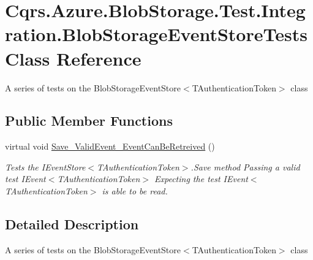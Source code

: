 \hypertarget{classCqrs_1_1Azure_1_1BlobStorage_1_1Test_1_1Integration_1_1BlobStorageEventStoreTests}{}\section{Cqrs.\+Azure.\+Blob\+Storage.\+Test.\+Integration.\+Blob\+Storage\+Event\+Store\+Tests Class Reference}
\label{classCqrs_1_1Azure_1_1BlobStorage_1_1Test_1_1Integration_1_1BlobStorageEventStoreTests}


A series of tests on the Blob\+Storage\+Event\+Store$<$\+T\+Authentication\+Token$>$ class  


\subsection*{Public Member Functions}
\begin{DoxyCompactItemize}
\item 
virtual void \hyperlink{classCqrs_1_1Azure_1_1BlobStorage_1_1Test_1_1Integration_1_1BlobStorageEventStoreTests_ac74c18e7aeeaedb7e0328b1ab8b2a8e8_ac74c18e7aeeaedb7e0328b1ab8b2a8e8}{Save\+\_\+\+Valid\+Event\+\_\+\+Event\+Can\+Be\+Retreived} ()
\begin{DoxyCompactList}\small\item\em Tests the I\+Event\+Store$<$\+T\+Authentication\+Token$>$.\+Save method Passing a valid test I\+Event$<$\+T\+Authentication\+Token$>$ Expecting the test I\+Event$<$\+T\+Authentication\+Token$>$ is able to be read. \end{DoxyCompactList}\end{DoxyCompactItemize}


\subsection{Detailed Description}
A series of tests on the Blob\+Storage\+Event\+Store$<$\+T\+Authentication\+Token$>$ class 



